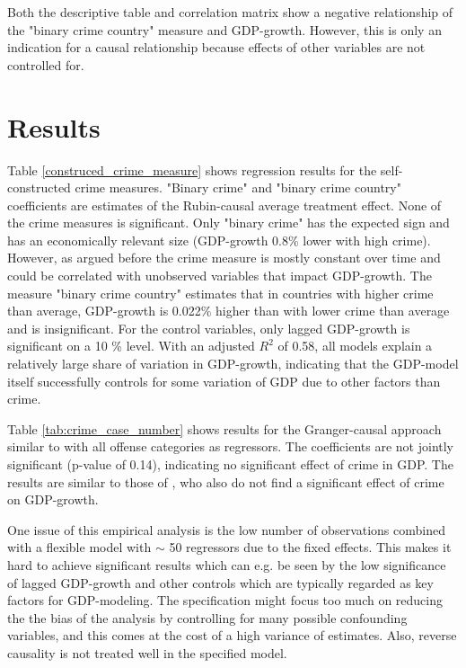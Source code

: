 \documentclass[a4paper,12pt]{article}
\begin{document}
Both the descriptive table and correlation matrix show a negative relationship of the "binary crime country" measure and GDP-growth. However, this is only an indication for a causal relationship because effects of other variables are not controlled for.

\section{Results}
\label{Results}


Table \ref{construced_crime_measure} shows regression results for the self-constructed crime measures. "Binary crime" and "binary crime country" coefficients are estimates of the Rubin-causal average treatment effect. 
None of the crime measures is significant. Only "binary crime" has the expected sign and has an economically relevant size (GDP-growth 0.8\% lower with high crime). However, as argued before the crime measure is mostly constant over time and could be correlated with unobserved variables that impact GDP-growth. The measure "binary crime country" estimates that in countries with higher crime than average, GDP-growth is 0.022\% higher than with lower crime than average and is insignificant.
For the control variables, only lagged GDP-growth is significant on a 10 \% level. With an adjusted $R^2$ of 0.58, all models explain a relatively large share of variation in GDP-growth, indicating that the GDP-model itself successfully controls for some variation of GDP due to other factors than crime.

Table \ref{tab:crime_case_number} shows results for the Granger-causal approach similar to \cite{entorf} with all offense categories as regressors. The coefficients are not jointly significant (p-value of 0.14), indicating no significant effect of crime in GDP. 
The results are similar to those of \cite{entorf}, who also do not find a significant effect of crime on GDP-growth. 

One issue of this empirical analysis is the low number of observations combined with a flexible model with $\sim$ 50 regressors due to the fixed effects. This makes it hard to achieve significant results which can e.g. be seen by the low significance of lagged GDP-growth and other controls which are typically regarded as key factors for GDP-modeling. The specification might focus too much on reducing the the bias of the analysis by controlling for many possible confounding variables, and this comes at the cost of a high variance of estimates. Also, reverse causality is not treated well in the specified model. 
\end{document}

